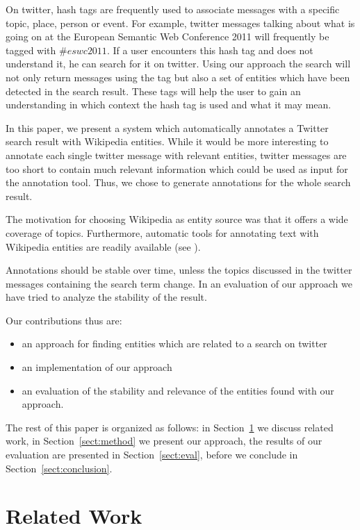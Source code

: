 \documentclass{llncs}
\begin{document}
On twitter, hash tags are frequently used to associate messages with a specific topic, place, person or event. For example, twitter messages talking about what is going on at the European Semantic Web Conference 2011 will frequently be tagged with $\#eswc2011$. If a user encounters this hash tag and does not understand it, he can search for it on twitter. Using our approach the search will not only return messages using the tag but also a set of entities which have been detected in the search result. These tags will help the user to gain an understanding in which context the hash tag is used and what it may mean.

In this paper, we present a system which automatically annotates a Twitter search result with Wikipedia entities. While it would be more interesting to annotate each single twitter message with relevant entities, twitter messages are too short to contain much relevant information which could be used as input for the annotation tool. Thus, we chose to generate annotations for the whole search result. 

The motivation for choosing Wikipedia as entity source was that it offers a wide coverage of topics. Furthermore, automatic tools for annotating text with Wikipedia entities are readily available (see \cite{key:wikifier}).

Annotations should be stable over time, unless the topics discussed in the twitter messages containing the search term change. In an evaluation of our approach we have tried to analyze the stability of the result.

Our contributions thus are:
\begin{itemize}
	\item an approach for finding entities which are related to a search on twitter
	\item an implementation of our approach
	\item an evaluation of the stability and relevance of the entities found with our approach.
\end{itemize}

The rest of this paper is organized as follows: in Section~\ref{sect:relWork} we discuss related work, in Section~\ref{sect:method} we present our approach, the results of our evaluation are presented in Section~\ref{sect:eval}, before we conclude in Section~\ref{sect:conclusion}.

\section{Related Work}
\label{sect:relWork}
\end{document}
